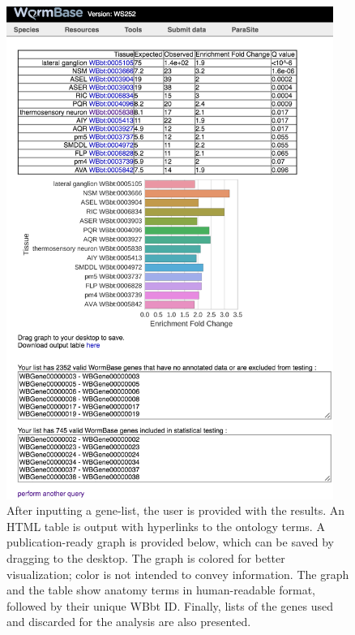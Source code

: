 \documentclass{bmcart}
\begin{document}
\begin{backmatter}
\begin{figure}
	\centering
    \includegraphics[width=0.95\textwidth]{figures/guiresults.png}
  	\captionsetup{width= 0.95\textwidth}
 	\caption{
	After inputting a gene-list, the user is provided with the results. An HTML table is output with hyperlinks to the ontology terms. A publication-ready graph is provided below, which can be saved by  dragging to the desktop. The graph is colored for better visualization; color is not intended to convey information. The graph and the table show anatomy terms in  human-readable format, followed by their unique WBbt ID. Finally, lists  of the genes used and discarded for the analysis are also presented.
  }
  \label{fig:GUIresults}
\end{figure}



\end{backmatter}
\end{document}
